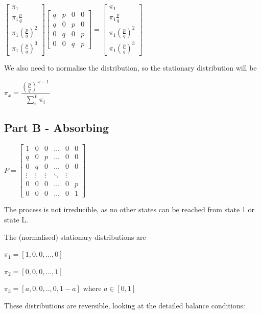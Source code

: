 \documentclass{article}
\begin{document}
 $\begin{bmatrix}
    \pi_1 \\
    \pi_1\frac{p}{q} \\
    \pi_1(\frac{p}{q})^2 \\
    \pi_1(\frac{p}{q})^3 
\end{bmatrix}
\begin{bmatrix}
    q & p & 0 & 0 \\
    q & 0 & p & 0\\
    0 & q & 0 & p\\
    0 & 0 & q & p
\end{bmatrix} = 
\begin{bmatrix}
    \pi_1 \\
    \pi_1\frac{p}{q} \\
    \pi_1(\frac{p}{q})^2 \\
    \pi_1(\frac{p}{q})^3 
\end{bmatrix}$

We also need to normalise the distribution, so the stationary distribution will be

$\pi_x = \dfrac{(\frac{p}{q})^{x-1}}{\sum_i^L{\pi_i}}$

\subsection{Part B - Absorbing}

$P = \begin{bmatrix}
    1 & 0 & 0 & \dots  & 0 & 0 \\
    q & 0 & p & \dots  & 0 & 0\\
    0 & q & 0 & \dots  & 0 & 0\\
    \vdots & \vdots & \vdots & \ddots & \vdots \\
    0 & 0 & 0 & \dots & 0 & p \\
    0 & 0 & 0 & \dots & 0 & 1
\end{bmatrix}$

The process is not irreducible, as no other states can be reached from state 1 or state L. 

The (normalised) stationary distributions are

$\pi_1 = [1,0,0,...,0]$

$\pi_2 = [0,0,0,...,1]$

$\pi_3 = [a,0,0,..,0,1-a] \text{ where } a \in [0,1]$



These distributions are reversible, looking at the detailed balance conditions:
\end{document}
